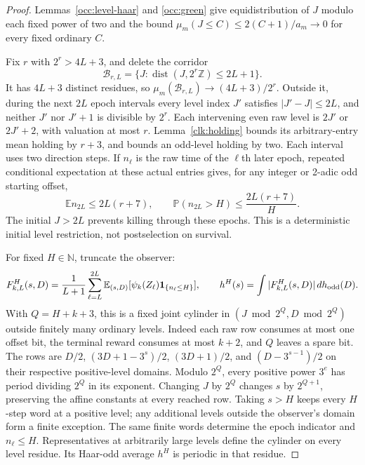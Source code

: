 \documentclass[11pt]{amsart}
\theoremstyle{definition}
\theoremstyle{remark}
\newcommand{\N}{\mathbb N}
\newcommand{\Z}{\mathbb Z}
\newcommand{\E}{\mathbb E}
\newcommand{\PP}{\mathbb P}
\newcommand{\one}{\mathbf 1}
\begin{document}
\begin{proof}
Lemmas~\ref{occ:level-haar} and \ref{occ:green} give equidistribution
of $J$ modulo each fixed power of two and the bound
$\mu_m(J\le C)\le2(C+1)/a_m\to0$ for every fixed ordinary $C$.

Fix $r$ with $2^r>4L+3$, and delete the corridor
\[
 \mathcal B_{r,L}=\{J:\operatorname{dist}(J,2^r\Z)\le2L+1\}.
\]
It has $4L+3$ distinct residues, so
$\mu_m(\mathcal B_{r,L})\to(4L+3)/2^r$.
Outside it, during the next $2L$ epoch intervals every level index
$J'$ satisfies $|J'-J|\le2L$, and neither $J'$ nor $J'+1$ is
divisible by $2^r$. Each intervening even raw level is $2J'$ or
$2J'+2$, with valuation at most $r$. Lemma~\ref{clk:holding} bounds
its arbitrary-entry mean holding by $r+3$, and bounds an odd-level
holding by two. Each interval uses two direction steps. If $n_\ell$
is the raw time of the $\ell$th later epoch, repeated conditional
expectation at these actual entries gives, for any integer or 2-adic
odd starting offset,
\begin{equation}\label{clk:raw-cap}
 \E n_{2L}\le2L(r+7),\qquad
 \PP(n_{2L}>H)\le\frac{2L(r+7)}H.
\end{equation}
The initial $J>2L$ prevents killing through these epochs. This is
a deterministic initial level restriction, not postselection on survival.

For fixed $H\in\N$, truncate the observer:
\[
 F^H_{k,L}(s,D)=\frac1{L+1}\sum_{\ell=L}^{2L}
       \E_{(s,D)}[\psi_k(Z_\ell)\one_{\{n_\ell\le H\}}],
 \qquad h^H(s)=\int|F^H_{k,L}(s,D)|\,dh_{\rm odd}(D).
\]
With $Q=H+k+3$, this is a fixed joint cylinder in
$(J\bmod2^Q,D\bmod2^Q)$ outside finitely many ordinary levels.
Indeed each raw row consumes at most one offset bit, the terminal
reward consumes at most $k+2$, and $Q$ leaves a spare bit.
The rows are
$D/2$, $(3D+1-3^s)/2$, $(3D+1)/2$, and
$(D-3^{s-1})/2$ on their respective positive-level domains.
Modulo $2^Q$, every positive power $3^e$ has period dividing
$2^Q$ in its exponent. Changing $J$ by $2^Q$ changes $s$ by
$2^{Q+1}$, preserving the affine constants at every reached row.
Taking $s>H$ keeps every $H$-step word at a positive level; any
additional levels outside the observer's domain form a finite exception.
The same finite words determine the epoch indicator and $n_\ell\le H$.
Representatives at arbitrarily large levels define the cylinder on every
level residue. Its Haar-odd average $h^H$ is periodic in that residue.


\end{proof}
\end{document}
